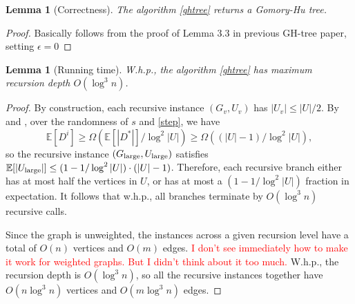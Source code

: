 \documentclass{article}
\newcommand{\cd}{\cdot}
\newcommand{\e}{\epsilon}
\newcommand{\Om}{\Omega}
\newcommand{\E}{\mathbb E}
\newcommand{\1}{\mathbbm 1}
\newtheorem{lemma}[theorem]{Lemma}
\newcommand{\BL}{\begin{lemma}}
\newcommand{\EL}{\end{lemma}}
\newcommand{\BP}{\begin{proof}}
\newcommand{\EP}{\end{proof}}
\newcommand{\alert}{\textcolor{red}}
\newcommand{\lem}[1]{\Cref{lem:#1}}
\newcommand{\cor}[1]{\Cref{cor:#1}}
\newcommand{\lar}{{\textup{large}}}
\begin{document}
\BL[Correctness]
The algorithm \ref{ghtree} returns a Gomory-Hu tree.
\EL
\BP
Basically follows from the proof of Lemma 3.3 in previous GH-tree paper, setting $\e=0$
\EP

\BL[Running time]
W.h.p., the algorithm \ref{ghtree} has maximum recursion depth $O(\log^3n)$.
\EL
\BP
By construction, each recursive instance $(G_v,U_v)$ has $|U_v|\le|U|/2$. By \cor{step} and \lem{random-s}, over the randomness of $s$ and \ref{step}, we have
\[ \E[D^i]\ge \Om(\E[|D^*|]/\log^2|U|) \ge \Om((|U|-1)/\log^2|U|) ,\]
so the recursive instance $(G_\lar,U_\lar)$ satisfies $\E[|U_\lar|]\le(1-1/\log^2|U|)\cd(|U|-1)$. Therefore, each recursive branch either has at most half the vertices in $U$, or has at most a $(1-1/\log^2|U|)$ fraction in expectation. It follows that w.h.p., all branches terminate by $O(\log^3n)$ recursive calls.

Since the graph is unweighted, the instances across a given recursion level have a total of $O(n)$ vertices and $O(m)$ edges. \alert{I don't see immediately how to make it work for weighted graphs. But I didn't think about it too much.} W.h.p., the recursion depth is $O(\log^3n)$, so all the recursive instances together have $O(n\log^3n)$ vertices and $O(m\log^3n)$ edges.
\EP
\end{document}
